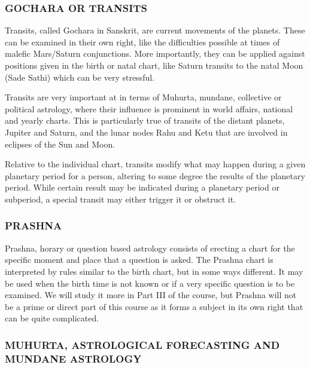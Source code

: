  

\subsubsection{GOCHARA OR TRANSITS}

 

Transits, called Gochara in Sanskrit, are current movements of the planets. These can be examined in their own right, like the difficulties possible at times of malefic Mars/Saturn conjunctions. More importantly, they can be applied against positions given in the birth or natal chart, like Saturn transits to the natal Moon (Sade Sathi) which can be very stressful.

 

Transits are very important at in terms of Muhurta, mundane, collective or political astrology, where their influence is prominent in world affairs, national and yearly charts. This is particularly true of transits of the distant planets, Jupiter and Saturn, and the lunar nodes Rahu and Ketu that are involved in eclipses of the Sun and Moon.

 

Relative  to the individual chart, transits modify what may happen during a given planetary period for a person, altering to some degree the results of the planetary period. While certain result may be indicated during a planetary period or subperiod, a special transit may either trigger it or obstruct it.

 

\subsubsection{PRASHNA}

 

Prashna, horary or question based astrology consists of erecting a chart for the specific moment and place that a question is asked. The Prashna chart is interpreted by rules similar to the birth chart, but in some ways different. It may be used when the birth time is not known or if a very specific question is to be examined. We will study it more in Part III of the course, but Prashna will not be a prime or direct part of this course as it forms a subject in its own right that can be quite complicated.

 

\subsubsection{MUHURTA, ASTROLOGICAL FORECASTING AND MUNDANE ASTROLOGY}

